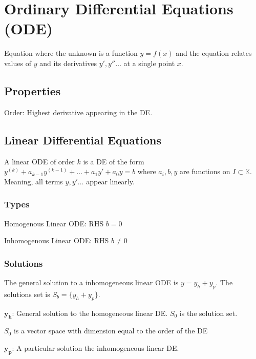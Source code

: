 
\section{Ordinary Differential Equations (ODE)}
Equation where the unknown is a function $y = f(x)$ and the equation relates values of $y$ and its derivatives $y', y'' \dots$ at a single point $x$.

\subsection{Properties}
\begin{compactdesc}
    \item[Order:] Highest derivative appearing in the DE.
\end{compactdesc}

\subsection{Linear Differential Equations}
A linear ODE of order $k$ is a DE of the form $y^{(k)} + a_{k - 1}y^{(k - 1)} + \dots + a_1y' + a_0y = b$ where $a_i, b, y$ are functions on $I \subset \mathbb{K}$. Meaning, all terms $y, y' \dots$ appear linearly.

\subsubsection{Types}
\begin{compactdesc}
    \item[Homogenous Linear ODE:] RHS $b = 0$
    \item[Inhomogenous Linear ODE:] RHS $b \neq 0$
\end{compactdesc}

\subsubsection{Solutions}
The general solution to a inhomogeneous linear ODE is $y = y_h + y_p$. The solutions set is $S_b = \{y_h + y_p\}$.
\begin{compactdesc}
    \item[$\mathbf{y_h}$:] General solution to the homogeneous linear DE. $S_0$ is the solution set.
        \begin{compactitem}
            \item $S_0$ is a vector space with dimension equal to the order of the DE
        \end{compactitem}
    \item[$\mathbf{y_p}$:] A particular solution the inhomogeneous linear DE.
\end{compactdesc}


